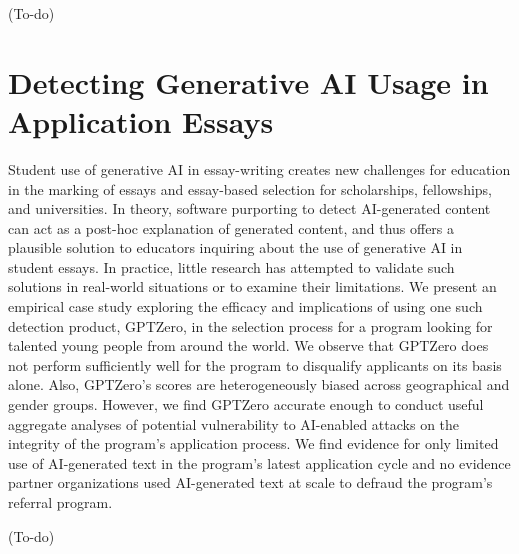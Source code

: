 (To-do)

\section{Detecting Generative AI Usage in Application Essays} %
Student use of generative AI in essay-writing creates new challenges for education in the marking of essays and essay-based selection for scholarships, fellowships, and universities. In theory, software purporting to detect AI-generated content can act as a post-hoc explanation of generated content, and thus offers a plausible solution to educators inquiring about the use of generative AI in student essays. In practice, little research has attempted to validate such solutions in real-world situations or to examine their limitations. We present an empirical case study exploring the efficacy and implications of using one such detection product, GPTZero, in the selection process for a program looking for talented young people from around the world. We observe that GPTZero does not perform sufficiently well for the program to disqualify applicants on its basis alone. Also, GPTZero's scores are heterogeneously biased across geographical and gender groups. However, we find GPTZero accurate enough to conduct useful aggregate analyses of potential vulnerability to AI-enabled attacks on the integrity of the program's application process. We find evidence for only limited use of AI-generated text in the program's latest application cycle and no evidence partner organizations used AI-generated text at scale to defraud the program's referral program.

(To-do)
